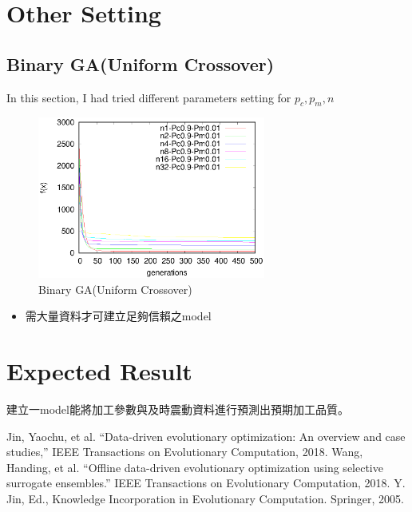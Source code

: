 ﻿\documentclass[conference]{IEEEtran}
\begin{document}
\begin{CJK}{UTF8}{bsmi}
\section{Other Setting}
\subsection{Binary GA(Uniform Crossover)}
In this section, I had tried different parameters setting for $p_{c}, p_{m}, n$ 

\begin{figure}[htbp]
\centerline{\includegraphics[width=7.5cm]{fig/bGA/change_n_2pt.eps}}
\caption{Binary GA(Uniform Crossover)}
\label{fig}
\end{figure}

\begin{itemize}
\item 需大量資料才可建立足夠信賴之model
\end{itemize}

\section{Expected Result}
建立一model能將加工參數與及時震動資料進行預測出預期加工品質。

\begin{thebibliography}{00}
 Jin, Yaochu, et al. ``Data-driven evolutionary optimization: An overview and case studies,'' IEEE Transactions on Evolutionary Computation, 2018.
 Wang, Handing, et al. ``Offline data-driven evolutionary optimization using selective surrogate ensembles.'' IEEE Transactions on Evolutionary Computation, 2018.
 Y.  Jin,  Ed., Knowledge  Incorporation  in  Evolutionary  Computation. Springer, 2005.

\end{thebibliography}
\vspace{12pt}
\end{CJK}
\end{document}
